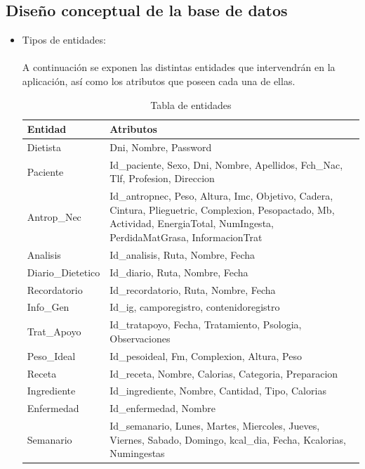 \subsection{Diseño conceptual de la base de datos}
\begin{itemize}
\item Tipos de entidades:\\\\
A continuación se exponen las distintas entidades que intervendrán en la aplicación, así como los atributos que poseen cada una de ellas. \\
\begin{table}[H]
\begin{center}
  \begin{tabular}{| l | p{12cm} |}
    \hline
    Entidad & Atributos \\ \hline
    Dietista & Dni, Nombre, Password \\ \hline
    Paciente & Id\_paciente, Sexo, Dni, Nombre, Apellidos, Fch\_Nac, Tlf, Profesion, Direccion \\ \hline
	Antrop\_Nec & Id\_antropnec, Peso, Altura, Imc, Objetivo, Cadera, Cintura, Plieguetric, Complexion, Pesopactado, Mb, Actividad, EnergiaTotal, NumIngesta, PerdidaMatGrasa, InformacionTrat \\ \hline
	Analisis & Id\_analisis, Ruta, Nombre, Fecha \\ \hline
	Diario\_Dietetico & Id\_diario, Ruta, Nombre, Fecha \\ \hline
	Recordatorio & Id\_recordatorio, Ruta, Nombre, Fecha \\ \hline
	Info\_Gen & Id\_ig, camporegistro, contenidoregistro \\ \hline
	Trat\_Apoyo & Id\_tratapoyo, Fecha, Tratamiento, Psologia, Observaciones \\ \hline
	Peso\_Ideal & Id\_pesoideal, Fm, Complexion, Altura, Peso \\ \hline
	Receta & Id\_receta, Nombre, Calorias, Categoria, Preparacion \\ \hline
	Ingrediente & Id\_ingrediente, Nombre, Cantidad, Tipo, Calorias \\ \hline
	Enfermedad & Id\_enfermedad, Nombre \\ \hline
	Semanario & Id\_semanario, Lunes, Martes, Miercoles, Jueves, Viernes, Sabado, Domingo, kcal\_dia, Fecha, Kcalorias, Numingestas \\
	\hline
  \end{tabular}
\end{center}
\caption{Tabla de entidades}

\end{table}
\end{itemize}
